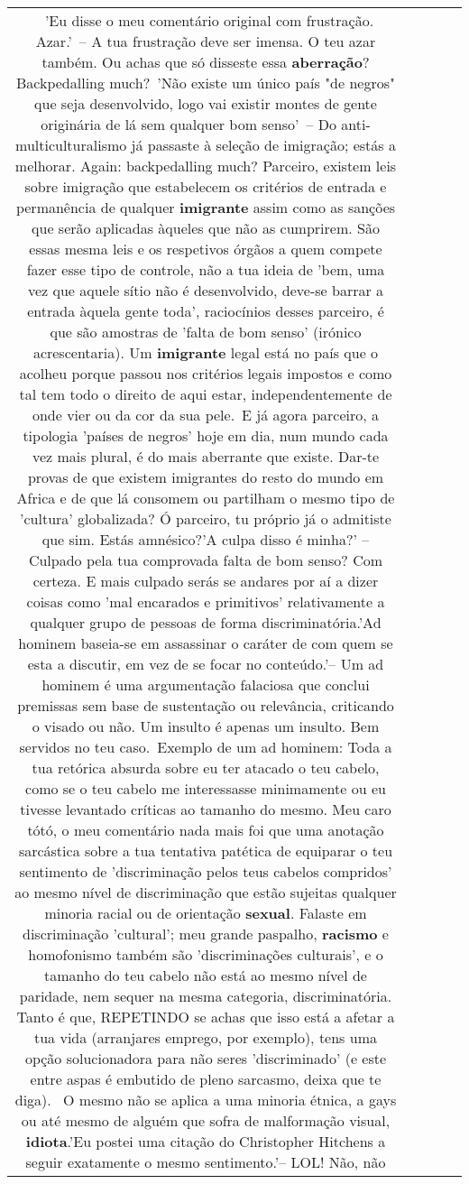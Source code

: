 \documentclass[11pt]{article}
\newlength\mylength
\begin{document}
\begin{center}
\begin{longtable}{|C{.65\mylength}|C{.30\mylength}|C{.12\mylength}|C{.12\mylength}|C{.12\mylength}|}
  \small {} 'Eu disse o meu comentário original com frustração. Azar.' – A tua frustração deve ser imensa. O teu azar também. Ou achas que só disseste essa \textbf{aberração}? Backpedalling much? 'Não existe um único país "de negros" que seja desenvolvido, logo vai existir montes de gente originária de lá sem qualquer bom senso' – Do anti-multiculturalismo já passaste à seleção de imigração; estás a melhorar. Again: backpedalling much? Parceiro, existem leis sobre imigração que estabelecem os critérios de entrada e permanência de qualquer \textbf{imigrante} assim como as sanções que serão aplicadas àqueles que não as cumprirem. São essas mesma leis e os respetivos órgãos a quem compete fazer esse tipo de controle, não a tua ideia de 'bem, uma vez que aquele sítio não é desenvolvido, deve-se barrar a entrada àquela gente toda', raciocínios desses parceiro, é que são amostras de 'falta de bom senso' (irónico acrescentaria). Um \textbf{imigrante} legal está no país que o acolheu porque passou nos critérios legais impostos e como tal tem todo o direito de aqui estar, independentemente de onde vier ou da cor da sua pele. E já agora parceiro, a tipologia 'países de negros' hoje em dia, num mundo cada vez mais plural, é do mais aberrante que existe. Dar-te provas de que existem imigrantes do resto do mundo em Africa e de que lá consomem ou partilham o mesmo tipo de 'cultura' globalizada? Ó parceiro, tu próprio já o admitiste que sim. Estás amnésico?'A culpa disso é minha?' – Culpado pela tua comprovada falta de bom senso? Com certeza. E mais culpado serás se andares por aí a dizer coisas como 'mal encarados e primitivos' relativamente a qualquer grupo de pessoas de forma discriminatória.'Ad hominem baseia-se em assassinar o caráter de com quem se esta a discutir, em vez de se focar no conteúdo.'– Um ad hominem é uma argumentação falaciosa que conclui premissas sem base de sustentação ou relevância, criticando o visado ou não. Um insulto é apenas um insulto. Bem servidos no teu caso. Exemplo de um ad hominem: Toda a tua retórica absurda sobre eu ter atacado o teu cabelo, como se o teu cabelo me interessasse minimamente ou eu tivesse levantado críticas ao tamanho do mesmo. Meu caro tótó, o meu comentário nada mais foi que uma anotação sarcástica sobre a tua tentativa patética de equiparar o teu sentimento de 'discriminação pelos teus cabelos compridos' ao mesmo nível de discriminação que estão sujeitas qualquer minoria racial ou de orientação \textbf{sexual}. Falaste em discriminação 'cultural'; meu grande paspalho, \textbf{racismo} e homofonismo também são 'discriminações culturais', e o tamanho do teu cabelo não está ao mesmo nível de paridade, nem sequer na mesma categoria, discriminatória. Tanto é que, REPETINDO se achas que isso está a afetar a tua vida (arranjares emprego, por exemplo), tens uma opção solucionadora para não seres 'discriminado' (e este entre aspas é embutido de pleno sarcasmo, deixa que te diga).  O mesmo não se aplica a uma minoria étnica, a gays ou até mesmo de alguém que sofra de malformação visual, \textbf{idiota}.'Eu postei uma citação do Christopher Hitchens a seguir exatamente o mesmo sentimento.'– LOL! Não, não 
\end{longtable}
\end{center}
\end{document}
